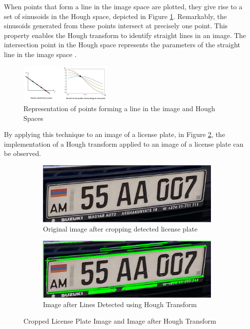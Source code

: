 \documentclass[conference]{IEEEtran}
\begin{document}
When points that form a line in the image space are plotted, they give rise to a set of sinusoids in the Hough space, depicted in Figure \ref{fig:Picture22}. Remarkably, the sinusoids generated from these points intersect at precisely one point. This property enables the Hough transform to identify straight lines in an image. The intersection point in the Hough space represents the parameters of the straight line in the image space \cite{b15}. 

\begin{figure}[h]
    \centering
    \includegraphics[width=0.4\textwidth]{images/Picture22.png}
    \caption{Representation of points forming a line in the image and Hough Spaces \cite{b15}}
    \label{fig:Picture22}
    
\end{figure}

By applying this technique to an image of a license plate, in Figure \ref{fig:combined6}, the implementation of a Hough transform applied to an image of a  license plate can be observed. 

\begin{figure}[ht]
  \centering
  \begin{subfigure}[b]{0.45\linewidth}
    \includegraphics[width=\linewidth]{images/Picture23.png}
    \caption{Original image after cropping detected license plate}
  \end{subfigure}
  \begin{subfigure}[b]{0.45\linewidth}
    \includegraphics[width=\linewidth]{images/Picture24.png}
    \caption{Image after Lines Detected using Hough Transform}
  \end{subfigure}
  \caption{Cropped License Plate Image and Image after Hough Transform}
  \label{fig:combined6}
\end{figure}
\end{document}
